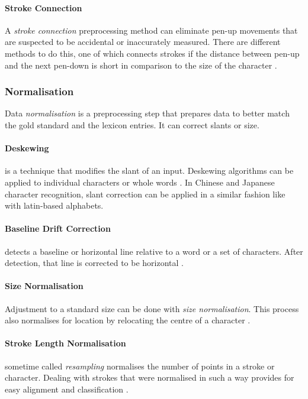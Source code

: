 \paragraph{Stroke Connection}
\label{sec:strokeconnection}
A \emph{stroke connection} preprocessing method can eliminate pen-up movements
that are suspected to be accidental or inaccurately measured. There are different
methods to do this, one of which connects strokes if the distance between pen-up
and the next pen-down is short in comparison to the size of the character 
.

\subsubsection{Normalisation} 
\label{sec:normalisation}
Data \emph{normalisation} is a preprocessing step that prepares data to better
match the gold standard and the lexicon entries. It can correct slants or size.

\paragraph{Deskewing}
is a technique that modifies the slant of an input. Deskewing 
algorithms can be applied to individual characters or whole words . In Chinese and Japanese character recognition, slant correction can
be applied in a similar fashion like with latin-based alphabets.

\paragraph{Baseline Drift Correction} 
detects a baseline or horizontal line relative
to a word or a set of characters. After detection, that line is corrected to
be horizontal .

\paragraph{Size Normalisation}
Adjustment to a standard size can be done with \emph{size normalisation}. This 
process also normalises for location by relocating the centre of a character
.

\paragraph{Stroke Length Normalisation}
sometime called \emph{resampling} normalises
the number of points in a stroke or character. Dealing with strokes that were 
normalised in such a way provides for easy alignment and classification 
. 


